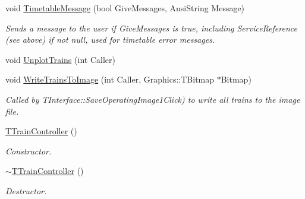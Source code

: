 \begin{DoxyCompactItemize}
\item 
\mbox{\label{class_t_train_controller_a68d2124bc8f7df43e973299e0afb3dcd}} 
void \mbox{\hyperlink{class_t_train_controller_a68d2124bc8f7df43e973299e0afb3dcd}{Timetable\+Message}} (bool Give\+Messages, Ansi\+String Message)
\begin{DoxyCompactList}\small\item\em Sends a message to the user if Give\+Messages is true, including Service\+Reference (see above) if not null, used for timetable error messages. \end{DoxyCompactList}\item 
void \mbox{\hyperlink{class_t_train_controller_a7e2abfcc38e51933883d959c4155aca0}{Unplot\+Trains}} (int Caller)
\item 
\mbox{\label{class_t_train_controller_aa5e441a9ec80e5076b2c05c2bb6f3fd3}} 
void \mbox{\hyperlink{class_t_train_controller_aa5e441a9ec80e5076b2c05c2bb6f3fd3}{Write\+Trains\+To\+Image}} (int Caller, Graphics\+::\+T\+Bitmap $\ast$Bitmap)
\begin{DoxyCompactList}\small\item\em Called by T\+Interface\+::\+Save\+Operating\+Image1\+Click) to write all trains to the image file. \end{DoxyCompactList}\item 
\mbox{\label{class_t_train_controller_aba4dd6fde9654353326cc36e6219ade7}} 
\mbox{\hyperlink{class_t_train_controller_aba4dd6fde9654353326cc36e6219ade7}{T\+Train\+Controller}} ()
\begin{DoxyCompactList}\small\item\em Constructor. \end{DoxyCompactList}\item 
\mbox{\label{class_t_train_controller_ad6cbfb50d0fddf2c6b43a1604da3b746}} 
\mbox{\hyperlink{class_t_train_controller_ad6cbfb50d0fddf2c6b43a1604da3b746}{$\sim$\+T\+Train\+Controller}} ()
\begin{DoxyCompactList}\small\item\em Destructor. \end{DoxyCompactList}\end{DoxyCompactItemize}
